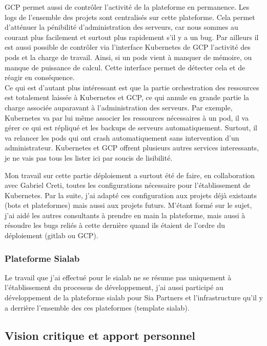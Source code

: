 \documentclass{article} %
\begin{document}
GCP permet aussi de contrôler l'activité de la plateforme en permanence. Les logs de l'ensemble des projets sont centralisés sur cette plateforme. Cela permet d'atténuer la pénibilité d'administration des serveurs, car nous sommes au courant plus facilement et surtout plus rapidement s'il y a un bug. Par ailleurs il est aussi possible de contrôler via l'interface Kubernetes de GCP l'activité des pods et la charge de travail. Ainsi, si un pods vient à manquer de mémoire, ou manque de puissance de calcul. Cette interface permet de détecter cela et de réagir en conséquence.\\
Ce qui est d'autant plus intéressant est que la partie orchestration des ressources est totalement laissée à Kubernetes et GCP, ce qui annule en grande partie la charge associée auparavant à l'administration des serveurs. Par exemple, Kubernetes va par lui même associer les ressources nécessaires à un pod, il va gérer ce qui est répliqué et les backups de serveurs automatiquement. Surtout, il va relancer les pods qui ont crash automatiquement sans intervention d'un administrateur. Kubernetes et GCP offrent plusieurs autres services interessants, je ne vais pas tous les lister ici par soucis de lisibilité. 


Mon travail sur cette partie déploiement a surtout été de faire, en collaboration avec Gabriel Creti, toutes les configurations nécessaire pour l'établissement de Kubernetes. Par la suite, j'ai adapté ces configuration aux projets déjà existants (bots et plateformes) mais aussi aux projets futurs. M'étant formé sur le sujet, j'ai aidé les autres consultants à prendre en main la plateforme, mais aussi à résoudre les bugs reliés à cette dernière quand ils étaient de l'ordre du déploiement (gitlab ou GCP). 

\subsubsection{Plateforme Sialab}
Le travail que j'ai effectué pour le sialab ne se résume pas uniquement à l'établissement du processus de développement, j'ai aussi participé au développement de la plateforme sialab pour Sia Partners et l'infrastructure qu'il y a derrière l'ensemble des ces plateformes (template sialab).

\subsection{Vision critique et apport personnel}
\end{document}
